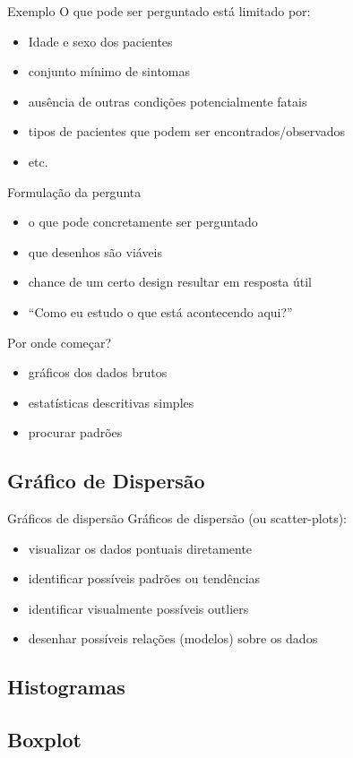 \documentclass{beamer}
\begin{document}
\begin{frame}{Exemplo}
  O que \alert{pode} ser perguntado está limitado por:
  \begin{itemize}
  \item Idade e sexo dos pacientes
  \item conjunto mínimo de sintomas
  \item ausência de outras condições potencialmente fatais
  \item tipos de pacientes que podem ser encontrados/observados
  \item etc.
  \end{itemize}
\end{frame}

\begin{frame}{Formulação da pergunta}
  \begin{itemize}
  \item o que pode concretamente ser perguntado
  \item que desenhos são viáveis
  \item chance de um certo design resultar em resposta útil
  \item ``Como eu estudo o que está acontecendo aqui?''
  \end{itemize}
\end{frame}

\begin{frame}{Por onde começar?}
  \begin{itemize}
  \item gráficos dos dados brutos
  \item estatísticas descritivas simples
  \item procurar padrões
  \end{itemize}
\end{frame}

\subsection{Gráfico de Dispersão}

\begin{frame}{Gráficos de dispersão}
Gráficos de dispersão (ou scatter-plots):
  \begin{itemize}
  \item visualizar os dados pontuais diretamente
  \item identificar possíveis padrões ou tendências
  \item identificar visualmente possíveis outliers
  \item desenhar possíveis relações (modelos) sobre os dados
  \end{itemize}
\end{frame}

\subsection{Histogramas}

\subsection{Boxplot}
\end{document}
